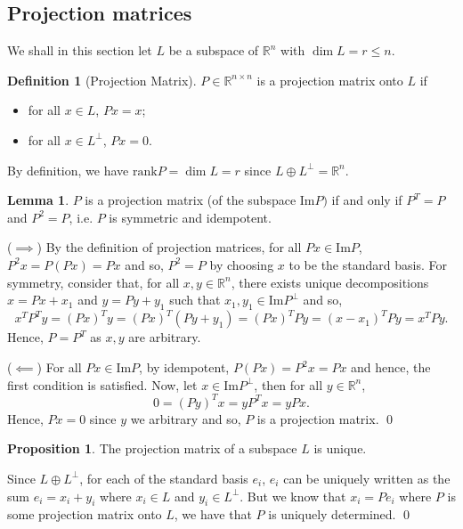 \documentclass[
]{article}
\theoremstyle{definition}
\newtheorem{prop}{Proposition}
\theoremstyle{definition}
\newtheorem{definition}{Definition}[section]
\newtheorem{lemma}{Lemma}[section]
\begin{document}
\hypertarget{projection-matrices}{%
\subsection{Projection matrices}\label{projection-matrices}}

We shall in this section let \(L\) be a subspace of \(\mathbb{R}^n\)
with \(\dim L = r \le n\).

\begin{definition}[Projection Matrix]
  \(P \in \mathbb{R}^{n \times n}\) is a projection matrix onto \(L\) if 
  \begin{itemize}
    \item for all \(x \in L\), \(Px = x\);
    \item for all \(x \in L^\perp\), \(Px = 0\).
  \end{itemize}
\end{definition}

By definition, we have \(\text{rank} P = \dim L = r\) since
\(L \oplus L^\perp = \mathbb{R}^n\).

\begin{lemma}
  \(P\) is a projection matrix (of the subspace \(\text{Im} P)\) if and only if 
  \(P^T = P\) and \(P^2 = P\), i.e. \(P\) is symmetric and idempotent.
\end{lemma}
\proof \hspace{0mm}

(\(\implies\)) By the definition of projection matrices, for all
\(Px \in \text{Im}P\), \(P^2 x = P(Px) = Px\) and so, \(P^2 = P\) by
choosing \(x\) to be the standard basis. For symmetry, consider that,
for all \(x, y \in \mathbb{R}^n\), there exists unique decompositions
\(x = P x + x_1\) and \(y = P y + y_1\) such that
\(x_1, y_1 \in \text{Im}P^\perp\) and so,
\[x^T P^T y = (P x)^T y = (P x)^T(P y + y_1) = (P x)^T P y
    = (x - x_1)^T P y = x^T P y.\] Hence, \(P = P^T\) as \(x, y\) are
arbitrary.

(\(\impliedby\)) For all \(P x \in \text{Im} P\), by idempotent,
\(P(P x) =  P^2 x = P x\) and hence, the first condition is satisfied.
Now, let \(x \in \text{Im}P^\perp\), then for all
\(y \in \mathbb{R}^n\), \[0 =(Py)^T x = y P^T x = y P x.\] Hence,
\(P x = 0\) since \(y\) we arbitrary and so, \(P\) is a projection
matrix. \qed

\begin{prop}
  The projection matrix of a subspace \(L\) is unique.
\end{prop}
\proof

Since \(L \oplus L^\perp\), for each of the standard basis \(e_i\),
\(e_i\) can be uniquely written as the sum \(e_i = x_i + y_i\) where
\(x_i \in L\) and \(y_i \in L^\perp\). But we know that \(x_i = P e_i\)
where \(P\) is some projection matrix onto \(L\), we have that \(P\) is
uniquely determined. \qed
\end{document}
